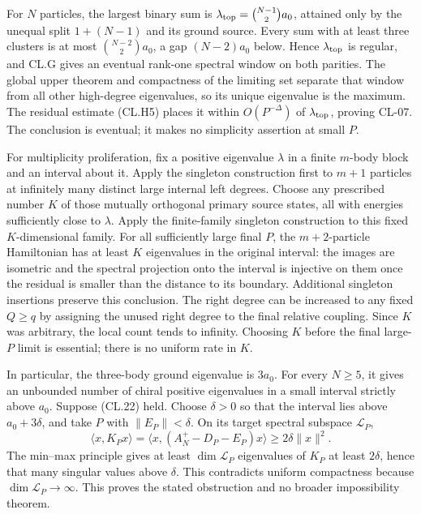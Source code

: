 \documentclass[a4paper,11pt]{article}
\numberwithin{equation}{section}
\begin{document}
For \(N\) particles, the largest binary sum is \(\lambda_{\rm top}=\binom{N-1}{2}a_0\), attained only by the unequal split \(1+(N-1)\) and its ground source. Every sum with at least three clusters is at most \(\binom{N-2}{2}a_0\), a gap \((N-2)a_0\) below. Hence \(\lambda_{\rm top}\) is regular, and CL.G gives an eventual rank-one spectral window on both parities. The global upper theorem and compactness of the limiting set separate that window from all other high-degree eigenvalues, so its unique eigenvalue is the maximum. The residual estimate (CL.H5) places it within \(O(P^{-\Delta})\) of \(\lambda_{\rm top}\), proving CL-07. The conclusion is eventual; it makes no simplicity assertion at small \(P\).

For multiplicity proliferation, fix a positive eigenvalue \(\lambda\) in a finite \(m\)-body block and an interval about it. Apply the singleton construction first to \(m+1\) particles at infinitely many distinct large internal left degrees. Choose any prescribed number \(K\) of those mutually orthogonal primary source states, all with energies sufficiently close to \(\lambda\). Apply the finite-family singleton construction to this fixed \(K\)-dimensional family. For all sufficiently large final \(P\), the \(m+2\)-particle Hamiltonian has at least \(K\) eigenvalues in the original interval: the images are isometric and the spectral projection onto the interval is injective on them once the residual is smaller than the distance to its boundary. Additional singleton insertions preserve this conclusion. The right degree can be increased to any fixed \(Q\geq q\) by assigning the unused right degree to the final relative coupling. Since \(K\) was arbitrary, the local count tends to infinity. Choosing \(K\) before the final large-\(P\) limit is essential; there is no uniform rate in \(K\).

In particular, the three-body ground eigenvalue is \(3a_0\). For every \(N\geq5\), it gives an unbounded number of chiral positive eigenvalues in a small interval strictly above \(a_0\). Suppose (CL.22) held. Choose \(\delta>0\) so that the interval lies above \(a_0+3\delta\), and take \(P\) with \(\|E_P\|<\delta\). On its target spectral subspace \(\mathcal L_P\), \[
\langle x,K_Px\rangle
=\langle x,(A_N^+-D_P-E_P)x\rangle
\geq2\delta\|x\|^2.
\] The min--max principle gives at least \(\dim\mathcal L_P\) eigenvalues of \(K_P\) at least \(2\delta\), hence that many singular values above \(\delta\). This contradicts uniform compactness because \(\dim\mathcal L_P\to\infty\). This proves the stated obstruction and no broader impossibility theorem.
\end{document}
